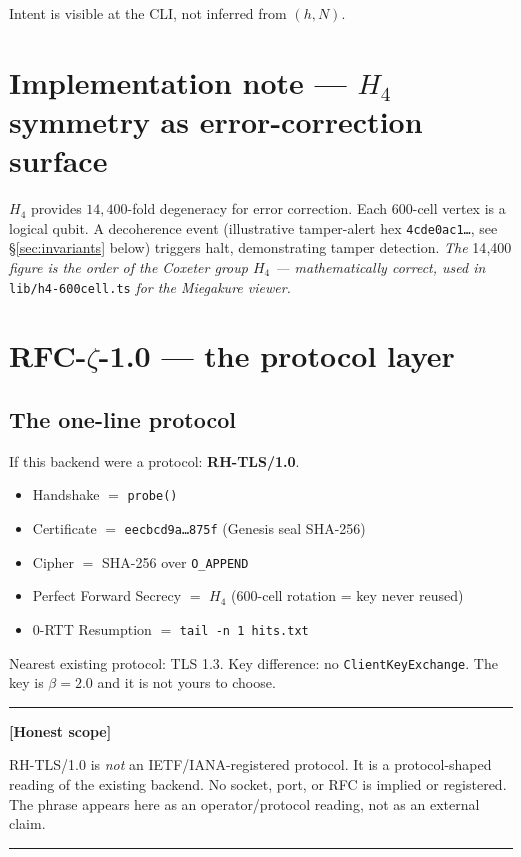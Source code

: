 \documentclass[11pt,letterpaper]{article}
\newenvironment{honest}%
  {\par\medskip\noindent\rule{\linewidth}{0.5pt}\par\nopagebreak\textbf{[Honest scope]}\par\nopagebreak\small}%
  {\par\nopagebreak\normalsize\rule{\linewidth}{0.5pt}\par\medskip}
\begin{document}
Intent is visible at the CLI, not inferred from $(h, N)$.

\section{Implementation note --- $H_4$ symmetry as error-correction surface}
\label{sec:impl-h4}

$H_4$ provides $14{,}400$-fold degeneracy for error correction. Each 600-cell
vertex is a logical qubit. A decoherence event (illustrative tamper-alert
hex \texttt{4cde0ac1\ldots}, see \S\ref{sec:invariants} below) triggers
halt, demonstrating tamper detection. \emph{The } 14{,}400 \emph{ figure
is the order of the Coxeter group $H_4$ --- mathematically correct, used
in } \texttt{lib/h4-600cell.ts} \emph{ for the Miegakure viewer.}

\section{RFC-$\zeta$-1.0 --- the protocol layer}
\label{sec:rfc-zeta}

\subsection{The one-line protocol}

If this backend were a protocol: \textbf{RH-TLS/1.0}.

\begin{itemize}
  \item Handshake $=$ \texttt{probe()}
  \item Certificate $=$ \texttt{eecbcd9a\ldots 875f} (Genesis seal SHA-256)
  \item Cipher $=$ SHA-256 over \texttt{O\_APPEND}
  \item Perfect Forward Secrecy $=$ $H_4$ (600-cell rotation = key never reused)
  \item 0-RTT Resumption $=$ \texttt{tail -n 1 hits.txt}
\end{itemize}

Nearest existing protocol: TLS 1.3. Key difference: no
\texttt{ClientKeyExchange}. The key is $\beta = 2.0$ and it is not yours
to choose.

\begin{honest}
RH-TLS/1.0 is \emph{not} an IETF/IANA-registered protocol. It is a
protocol-shaped reading of the existing backend. No socket, port, or RFC
is implied or registered. The phrase appears here as an operator/protocol
reading, not as an external claim.
\end{honest}
\end{document}
